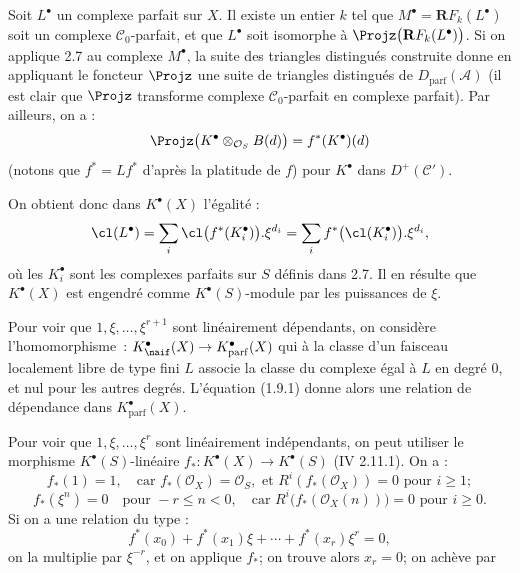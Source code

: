Soit $L^{\bullet}$ un complexe parfait sur $X$. Il existe un entier $k$ tel que $M^{\bullet}=\mathbf R F_k(L^{\bullet})$ soit un complexe $\mathcal C_0$-parfait, et que $L^{\bullet}$ soit isomorphe à $\Projz\bigl(\mathbf R F_k(L^{\bullet})\bigr)$. Si on applique 2.7 au complexe $M^{\bullet}$, la suite des triangles distingués construite donne en appliquant le foncteur $\Projz$ une suite de triangles distingués de $D_{\mathrm{parf}}(\mathcal A)$ (il est clair que $\Projz$ transforme complexe $\mathcal C_0$-parfait en complexe parfait). Par ailleurs, on a :
\[
  \Projz\bigl(K^{\bullet}\otimes_{\mathcal O_S}B(d)\bigr)
  = f^*(K^{\bullet})(d)
\]
(notons que $f^*=L f^*$ d'après la platitude de $f$) pour $K^{\bullet}$ dans $D^+(\mathcal C')$.

On obtient donc dans $K^{\bullet}(X)$ l'égalité :
\[
  \cl(L^{\bullet})
  =\sum_i\cl\bigl(f^*(K_i^{\bullet})\bigr).\xi^{d_i}
  =\sum_i f^*\bigl(\cl(K_i^{\bullet})\bigr).\xi^{d_i},
\]
où les $K_i^{\bullet}$ sont les complexes parfaits sur $S$ définis dans 2.7. Il en résulte que $K^{\bullet}(X)$ est engendré comme $K^{\bullet}(S)$-module par les puissances de $\xi$.

Pour voir que $1,\xi,\ldots,\xi^{r+1}$ sont linéairement dépendants, on considère l'homomorphisme~: $K^{\bullet}_{\naif}(X)\to K^{\bullet}_{\mathrm{parf}}(X)$ qui à la classe d'un faisceau localement libre de type fini $L$ associe la classe du complexe égal à $L$ en degré $0$, et nul pour les autres degrés. L'équation (1.9.1) donne alors une relation de dépendance dans $K^{\bullet}_{\mathrm{parf}}(X)$.

Pour voir que $1,\xi,\ldots,\xi^r$ sont linéairement indépendants, on peut utiliser le morphisme $K^{\bullet}(S)$-linéaire $f_*:K^{\bullet}(X)\to K^{\bullet}(S)$ (IV 2.11.1). On a :
\[
  f_*(1)=1,
  \quad\text{car } f_*(\mathcal O_X)=\mathcal O_S,\text{ et }R^i(f_*(\mathcal O_X))=0\text{ pour }i\geq1;
\]
\[
  f_*(\xi^n)=0\quad\text{pour }-r\leq n<0,
  \quad\text{car }R^i\bigl(f_*(\mathcal O_X(n))\bigr)=0\text{ pour }i\geq0.
\]
Si on a une relation du type :
\[
  f^*(x_0)+f^*(x_1)\xi+\cdots+f^*(x_r)\xi^r=0,
\]
on la multiplie par $\xi^{-r}$, et on applique $f_*$; on trouve alors $x_r=0$; on achève par
